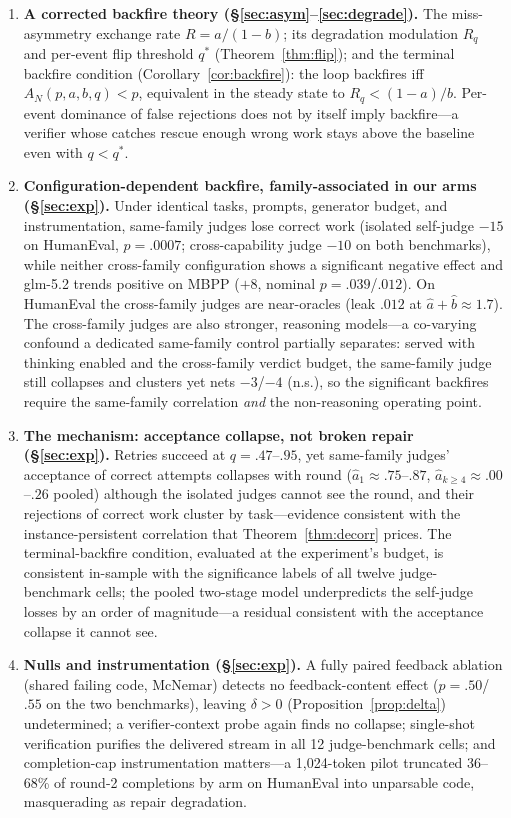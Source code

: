\documentclass[10pt]{article}
\begin{document}
\begin{enumerate}
\item \textbf{A corrected backfire theory
(§\ref{sec:asym}--\ref{sec:degrade}).}  The miss-asymmetry exchange
rate $R = a/(1-b)$; its degradation modulation $R_q$ and per-event
flip threshold $q^\ast$ (Theorem~\ref{thm:flip}); and the terminal
backfire condition (Corollary~\ref{cor:backfire}): the loop
backfires iff $A_N(p,a,b,q) < p$, equivalent in the steady state to
$R_q < (1-a)/b$.  Per-event dominance of false rejections does not
by itself imply backfire---a verifier whose catches rescue enough
wrong work stays above the baseline even with $q < q^\ast$.
\item \textbf{Configuration-dependent backfire,
family-associated in our arms (§\ref{sec:exp}).}  Under identical
tasks, prompts, generator budget, and instrumentation, same-family
judges lose correct work (isolated self-judge $-15$ on HumanEval,
$p=.0007$; cross-capability judge $-10$ on both benchmarks), while
neither cross-family configuration shows a significant negative
effect and glm-5.2 trends positive on MBPP ($+8$, nominal
$p=.039$/$.012$).  On HumanEval the cross-family judges are
near-oracles (leak $.012$ at $\hat a + \hat b \approx 1.7$).  The
cross-family judges are also stronger, reasoning models---a
co-varying confound a dedicated same-family control partially
separates: served with thinking enabled and the cross-family
verdict budget, the same-family judge still collapses and
clusters yet nets $-3$/$-4$ (n.s.), so the significant backfires
require the same-family correlation \emph{and} the non-reasoning
operating point.
\item \textbf{The mechanism: acceptance collapse, not broken
repair (§\ref{sec:exp}).}  Retries succeed at $q=.47$--$.95$, yet
same-family judges' acceptance of correct attempts collapses with
round ($\hat a_1 \approx .75$--$.87$,
$\hat a_{k \ge 4} \approx .00$--$.26$ pooled) although the isolated
judges cannot see the round, and their rejections of correct work
cluster by task---evidence consistent with the instance-persistent
correlation that Theorem~\ref{thm:decorr} prices.  The terminal-backfire condition, evaluated at the experiment's
budget, is consistent in-sample with the significance labels of
all twelve judge-benchmark cells; the pooled two-stage model
underpredicts the self-judge losses by an order of magnitude---a
residual consistent with the acceptance collapse it cannot see.
\item \textbf{Nulls and instrumentation (§\ref{sec:exp}).}
A fully paired feedback ablation (shared failing code, McNemar)
detects no feedback-content effect ($p = .50$/$.55$ on the two
benchmarks), leaving $\delta > 0$
(Proposition~\ref{prop:delta}) undetermined; a verifier-context
probe again finds no collapse; single-shot verification purifies
the delivered stream in all 12 judge-benchmark cells; and
completion-cap instrumentation matters---a 1{,}024-token pilot
truncated 36--68\% of round-2 completions by arm on HumanEval
into unparsable code, masquerading as repair degradation.
\end{enumerate}
\end{document}
